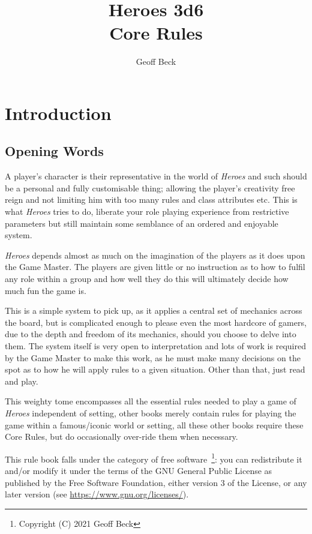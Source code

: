 \documentclass[a4paper,10pt,oneside]{book}
\title{\textbf{\huge Heroes 3d6\\Core Rules}}
\author{Geoff Beck}
\date{}
\begin{document}
\maketitle
\frontmatter
\tableofcontents
\mainmatter

\chapter{Introduction}

\section{Opening Words}
A player's character is their representative in the world of \textit{Heroes} and such should be a personal and fully customisable thing; allowing the player's creativity free reign and not limiting him with too many rules and class attributes etc. This is what \textit{Heroes} tries to do, liberate your role playing experience from restrictive parameters but still maintain some semblance of an ordered and enjoyable system.

\textit{Heroes} depends almost as much on the imagination of the players as it does upon the Game Master. The players are given little or no instruction as to how to fulfil any role within a group and how well they do this will ultimately decide how much fun the game is.

This is a simple system to pick up, as it applies a central set of mechanics across the board, but is complicated enough to please even the most hardcore of gamers, due to the depth and freedom of its mechanics, should you choose to delve into them. The system itself is very open to interpretation and lots of work is required by the Game Master to make this work, as he must make many decisions on the spot as to how he will apply rules to a given situation. Other than that, just read and play.

This weighty tome encompasses all the essential rules needed to play a game of \textit{Heroes} independent of setting, other books merely contain rules for playing the game within a famous/iconic world or setting, all these other books require these Core Rules, but do occasionally over-ride them when necessary.

This rule book falls under the category of free software~\footnote{Copyright (C) 2021  Geoff Beck}: you can redistribute it and/or modify
it under the terms of the GNU General Public License as published by
the Free Software Foundation, either version 3 of the License, or any later version (see \url{https://www.gnu.org/licenses/}).
\end{document}
